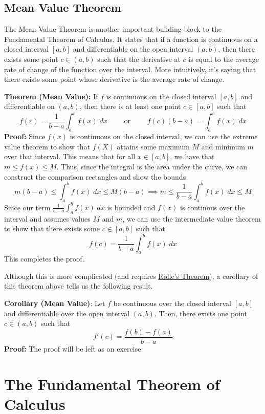 \subsection{Mean Value Theorem}
The Mean Value Theorem is another important building block to the Fundamental Theorem of Calculus. It states that if a function is continuous on a closed interval $[a,b]$ and differentiable on the open interval $(a,b)$, then there exists some point $c \in (a,b)$ such that the derivative at $c$ is equal to the average rate of change of the function over the interval. More intuitively, it's saying that there exists some point whose derivative is the average rate of change.
\begin{boxedsection}
\textbf{Theorem (Mean Value):} If $f$ is continuous on the closed interval $[a,b]$ and differentiable on $(a,b)$, then there is at least one point $c \in [a,b]$ such that
$$
f(c) = \frac{1}{b-a} \int_a^b f(x)\;dx \quad \quad \text{ or } \quad \quad f(c)(b-a) = \int_a^b f(x)\;dx
$$
\textbf{Proof:} Since $f(x)$ is continuous on the closed interval, we can use the extreme value theorem to show that $f(X)$ attains some maximum $M$ and minimum $m$ over that interval. This means that for all $x \in [a,b]$, we have that $m \leq f(x) \leq M$. Thus, since the integral is the area under the curve, we can construct the comparison rectangles and show the bounds
$$
m(b-a) \leq \int_a^b f(x)\;dx \leq M(b-a) \implies m \leq \frac{1}{b-a} \int_a^b f(x)\;dx \leq M
$$
Since our term $\frac{1}{b-a} \int_a^b f(x)\;dx$ is bounded and $f(x)$ is continous over the interval and assumes values $M$ and $m$, we can use the intermediate value  theorem to show that there exists some $c \in [a,b]$ such that
$$
f(c) = \frac{1}{b-a} \int_a^b f(x)\;dx
$$
This completes the proof.
\end{boxedsection}
Although this is more complicated (and requires \href{https://mathcenter.oxford.emory.edu/site/math111/proofs/rollesTheorem/}{Rolle's Theorem}), a corollary of this theorem above tells us the following result.
\begin{boxedsection}
  \textbf{Corollary (Mean Value)}: Let $f$ be continuous over the closed interval $[a,b]$ and differentiable over the open interval $(a,b)$. Then, there exists one point $c \in (a,b)$ such that
  $$
  f'(c) = \frac{f(b)-f(a)}{b-a}
  $$
  \textbf{Proof:} The proof will be left as an exercise.
\end{boxedsection}
\pagebreak
\section{The Fundamental Theorem of Calculus}
